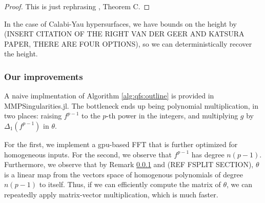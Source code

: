 \begin{proof}
	This is just rephrasing \cite{quasifedder}, Theorem C.
\end{proof}

In the case of Calabi-Yau hypersurfaces, we have bounds on the height by
(INSERT CITATION OF THE RIGHT VAN DER GEER AND KATSURA PAPER, THERE ARE FOUR OPTIONS), 
so we can deterministically recover the height.  

\subsubsection{Our improvements}

A naive implmentation of Algorithm \ref{alg:qfs:outline}
is provided in MMPSingularities.jl.
The bottleneck ends up being polynomial multiplication, 
in two places:
raising \(f^{p-1}\) to the \(p\)-th power in the integers,
and multiplying \(g\) by \(\Delta_{1}(f^{p-1})\) 
in \(\theta\).

For the first, we implement a gpu-based FFT that is
further optimized for homogeneous inputs.
For the second, we observe that \(f^{p-1}\) has degree
\(n(p-1)\). 
Furthermore, we observe that by Remark \ref{} and 
(REF FSPLIT SECTION), \(\theta\) is a linear map
from the vectors space of 
homogenous polynomials of degree \(n(p-1)\) 
to itself.
Thus, if we can efficiently compute the matrix of \(\theta\),
we can repeatedly apply matrix-vector multiplication,
which is much faster.


